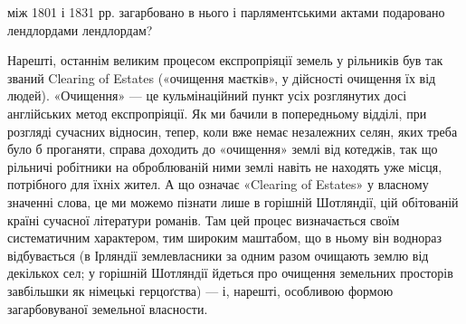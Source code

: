 \parcont{}  %
між 1801 і 1831 рр. загарбовано в нього і парляментськими актами подаровано
лендлордами лендлордам?

Нарешті, останнім великим процесом експропріяції земель у
рільників був так званий Clearing of Estates («очищення маєтків»,
у дійсності очищення їх від людей). «Очищення» — це кульмінаційний
пункт усіх розглянутих досі англійських метод експропріяції.
Як ми бачили в попередньому відділі, при розгляді сучасних відносин,
тепер, коли вже немає незалежних селян, яких треба було б проганяти,
справа доходить до «очищення» землі від котеджів, так що рільничі
робітники на оброблюваній ними землі навіть не находять уже місця,
потрібного для їхніх жител. А що означає «Clearing of Estates» у
власному значенні слова, це ми можемо пізнати лише в горішній Шотляндії,
цій обітованій країні сучасної літератури романів. Там цей процес
визначається своїм систематичним характером, тим широким маштабом,
що в ньому він воднораз відбувається (в Ірляндії землевласники за
одним разом очищають землю від декількох сел; у горішній
Шотляндії йдеться про очищення земельних просторів
завбільшки як німецькі герцоґства) — і, нарешті, особливою формою
загарбовуваної земельної власности.

